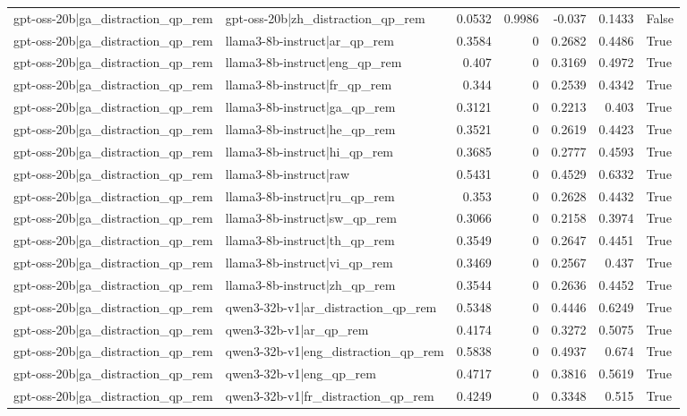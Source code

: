 \begin{table}
\begin{tabular}{l l r r r r l}
gpt-oss-20b|ga_distraction_qp_rem & gpt-oss-20b|zh_distraction_qp_rem & 0.0532 & 0.9986 & -0.037 & 0.1433 & False \\
gpt-oss-20b|ga_distraction_qp_rem & llama3-8b-instruct|ar_qp_rem & 0.3584 & 0 & 0.2682 & 0.4486 & True \\
gpt-oss-20b|ga_distraction_qp_rem & llama3-8b-instruct|eng_qp_rem & 0.407 & 0 & 0.3169 & 0.4972 & True \\
gpt-oss-20b|ga_distraction_qp_rem & llama3-8b-instruct|fr_qp_rem & 0.344 & 0 & 0.2539 & 0.4342 & True \\
gpt-oss-20b|ga_distraction_qp_rem & llama3-8b-instruct|ga_qp_rem & 0.3121 & 0 & 0.2213 & 0.403 & True \\
gpt-oss-20b|ga_distraction_qp_rem & llama3-8b-instruct|he_qp_rem & 0.3521 & 0 & 0.2619 & 0.4423 & True \\
gpt-oss-20b|ga_distraction_qp_rem & llama3-8b-instruct|hi_qp_rem & 0.3685 & 0 & 0.2777 & 0.4593 & True \\
gpt-oss-20b|ga_distraction_qp_rem & llama3-8b-instruct|raw & 0.5431 & 0 & 0.4529 & 0.6332 & True \\
gpt-oss-20b|ga_distraction_qp_rem & llama3-8b-instruct|ru_qp_rem & 0.353 & 0 & 0.2628 & 0.4432 & True \\
gpt-oss-20b|ga_distraction_qp_rem & llama3-8b-instruct|sw_qp_rem & 0.3066 & 0 & 0.2158 & 0.3974 & True \\
gpt-oss-20b|ga_distraction_qp_rem & llama3-8b-instruct|th_qp_rem & 0.3549 & 0 & 0.2647 & 0.4451 & True \\
gpt-oss-20b|ga_distraction_qp_rem & llama3-8b-instruct|vi_qp_rem & 0.3469 & 0 & 0.2567 & 0.437 & True \\
gpt-oss-20b|ga_distraction_qp_rem & llama3-8b-instruct|zh_qp_rem & 0.3544 & 0 & 0.2636 & 0.4452 & True \\
gpt-oss-20b|ga_distraction_qp_rem & qwen3-32b-v1|ar_distraction_qp_rem & 0.5348 & 0 & 0.4446 & 0.6249 & True \\
gpt-oss-20b|ga_distraction_qp_rem & qwen3-32b-v1|ar_qp_rem & 0.4174 & 0 & 0.3272 & 0.5075 & True \\
gpt-oss-20b|ga_distraction_qp_rem & qwen3-32b-v1|eng_distraction_qp_rem & 0.5838 & 0 & 0.4937 & 0.674 & True \\
gpt-oss-20b|ga_distraction_qp_rem & qwen3-32b-v1|eng_qp_rem & 0.4717 & 0 & 0.3816 & 0.5619 & True \\
gpt-oss-20b|ga_distraction_qp_rem & qwen3-32b-v1|fr_distraction_qp_rem & 0.4249 & 0 & 0.3348 & 0.515 & True \\

\end{tabular}
\end{table}
